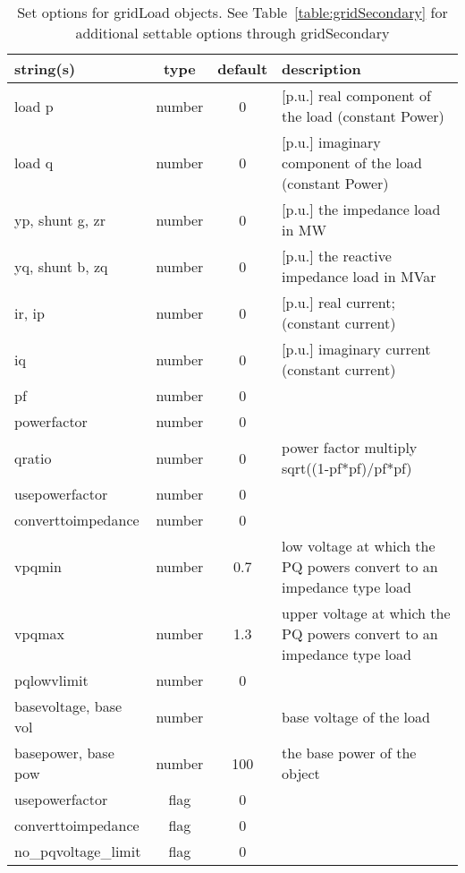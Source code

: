 \begin{table}[ht]
\centering
\begin{tabular}{p{5cm} c c p{7cm}}
\hline
string(s) & type & default & description \\
\hline
load p & number & 0 & [p.u.] real component of the load (constant Power)\\
load q & number & 0 & [p.u.] imaginary component of the load (constant Power)\\
yp, shunt g, zr & number & 0 & [p.u.] the impedance load in MW\\
yq, shunt b, zq & number & 0 & [p.u.]  the reactive impedance load in MVar\\
ir, ip & number & 0 & [p.u.] real current; (constant current)\\
iq & number & 0 & [p.u.] imaginary current (constant current)\\
pf & number & 0 & \\
powerfactor & number & 0 & \\
qratio & number & 0 & power factor multiply  sqrt((1-pf*pf)/pf*pf)\\
usepowerfactor & number & 0 & \\
converttoimpedance & number & 0 & \\
vpqmin & number & 0.7 & low voltage at which the PQ powers convert to an impedance type load\\
vpqmax & number & 1.3 & upper voltage at which the PQ powers convert to an impedance type load\\
pqlowvlimit & number & 0 & \\
basevoltage, base vol & number &  & base voltage of the load\\
basepower, base pow & number & 100 & the base power of the object\\
usepowerfactor & flag & 0 & \\
converttoimpedance & flag & 0 & \\
no\_pqvoltage\_limit & flag & 0 & \\
\hline
\end{tabular}
\caption{Set options for gridLoad objects. See Table~\ref{table:gridSecondary} for additional settable options through gridSecondary}
\label{table:gridLoad}
\end{table}
